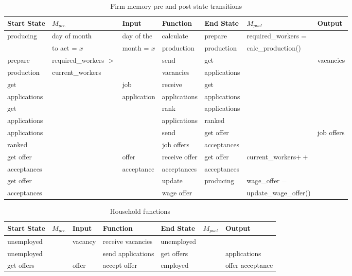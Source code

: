 \documentclass[a4paper,11pt]{article}
\begin{document}
\begin{landscape}
\begin{table}[tbp]
\centering
\begin{tabular}{|l|l|l||l||l|l|l|}
\hline
Start State&$M_{pre}$&Input&Function&End State&$M_{post}$&Output\\
\hline \hline
producing&day of month&day of the&calculate&prepare&required\_workers =&\\
&to act = $x$&month = $x$&production&production&calc\_production()&\\
\hline
prepare&required\_workers $>$&&send&get&&vacancies\\
production&current\_workers&&vacancies&applications&&\\
\hline
get&&job&receive&get&&\\
applications&&application&applications&applications&&\\
\hline
get&&&rank&applications&&\\
applications&&&applications&ranked&&\\
\hline
applications&&&send&get offer&&job offers\\
ranked&&&job offers&acceptances&&\\
\hline
get offer&&offer&receive offer&get offer&current\_workers$++$&\\
acceptances&&acceptance&acceptances&acceptances&&\\
\hline
get offer&&&update&producing&wage\_offer =&\\
acceptances&&&wage offer&&update\_wage\_offer()&\\
\hline
\end{tabular}
\caption{Firm memory pre and post state transitions} \label{tab:firmmemory}
\end{table}
\end{landscape}

\begin{landscape}
\begin{table}[tbp]
\centering
\begin{tabular}{|l|l|l||l||l|l|l|}
\hline
Start State&$M_{pre}$&Input&Function&End State&$M_{post}$&Output\\
\hline
\hline
unemployed&&vacancy&receive vacancies&unemployed&&\\
\hline
unemployed&&&send applications&get offers&&applications\\
\hline
get offers&&offer&accept offer&employed&&offer acceptance\\
\hline
\end{tabular}
\caption{Household functions}
\label{tab:householdfunctions1}
\end{table}
\end{landscape}
\end{document}
